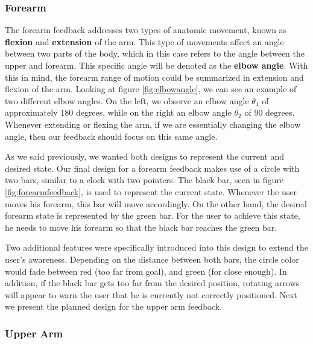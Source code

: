 \subsubsection{Forearm}

The forearm feedback addresses two types of anatomic movement, known as \textbf{flexion} and \textbf{extension} of the arm. 
This type of movements affect an angle between two parts of the body, which in this case refers to the angle between the upper and forearm. 
This specific angle will be denoted as the \textbf{elbow angle}.
With this in mind, the forearm range of motion could be summarized in extension and flexion of the arm.
Looking at figure \ref{fig:elbowangle}, we can see an example of two different elbow angles. 
On the left, we observe an elbow angle $\theta$$_1$ of approximately 180 degrees, while on the right an elbow angle $\theta$$_2$ of 90 degrees.  
Whenever extending or flexing the arm, if we are essentially changing the elbow angle, then our feedback should focus on this same angle.

As we said previously, we wanted both designs to represent the current and desired state. 
Our final design for a forearm feedback makes use of a circle with two bars, similar to a clock with two pointers.
The black bar, seen in figure \ref{fig:forearmfeedback}, is used to represent the current state. Whenever the user moves his forearm, this bar will move accordingly.
On the other hand, the desired forearm state is represented by the green bar. 
For the user to achieve this state, he needs to move his forearm so that the black bar reaches the green bar.

Two additional features were specifically introduced into this design to extend the user's awareness. 
Depending on the distance between both bars, the circle color would fade between red (too far from goal), and green (for close enough). 
In addition, if the black bar gets too far from the desired position, rotating arrows will appear to warn the user that he is currently not correctly positioned. 
Next we present the planned design for the upper arm feedback.

\subsubsection{Upper Arm}


